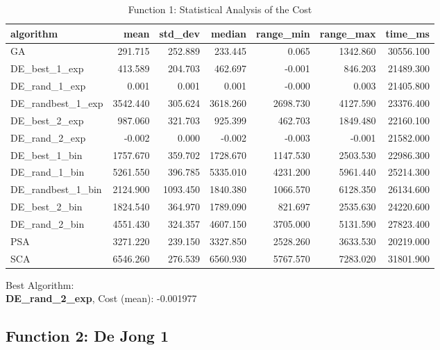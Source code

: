 \documentclass[12pt]{article}
\begin{document}
\begin{table}[H]
    \centering
    \footnotesize
\begin{tabular}{lrrrrrr}
\toprule
         algorithm &     mean &  std\_dev &   median &  range\_min &  range\_max &   time\_ms \\
\midrule
                GA &  291.715 &  252.889 &  233.445 &      0.065 &   1342.860 & 30556.100 \\
     DE\_best\_1\_exp &  413.589 &  204.703 &  462.697 &     -0.001 &    846.203 & 21489.300 \\
     DE\_rand\_1\_exp &    0.001 &    0.001 &    0.001 &     -0.000 &      0.003 & 21405.800 \\
 DE\_randbest\_1\_exp & 3542.440 &  305.624 & 3618.260 &   2698.730 &   4127.590 & 23376.400 \\
     DE\_best\_2\_exp &  987.060 &  321.703 &  925.399 &    462.703 &   1849.480 & 22160.100 \\
     DE\_rand\_2\_exp &   -0.002 &    0.000 &   -0.002 &     -0.003 &     -0.001 & 21582.000 \\
     DE\_best\_1\_bin & 1757.670 &  359.702 & 1728.670 &   1147.530 &   2503.530 & 22986.300 \\
     DE\_rand\_1\_bin & 5261.550 &  396.785 & 5335.010 &   4231.200 &   5961.440 & 25214.300 \\
 DE\_randbest\_1\_bin & 2124.900 & 1093.450 & 1840.380 &   1066.570 &   6128.350 & 26134.600 \\
     DE\_best\_2\_bin & 1824.540 &  364.970 & 1789.090 &    821.697 &   2535.630 & 24220.600 \\
     DE\_rand\_2\_bin & 4551.430 &  324.357 & 4607.150 &   3705.000 &   5131.590 & 27823.400 \\
               PSA & 3271.220 &  239.150 & 3327.850 &   2528.260 &   3633.530 & 20219.000 \\
               SCA & 6546.260 &  276.539 & 6560.930 &   5767.570 &   7283.020 & 31801.900 \\
\bottomrule
\end{tabular}

\caption{Function 1: Statistical Analysis of the Cost} 
    \end{table}
Best Algorithm: \\
\textbf{DE\_rand\_2\_exp}, Cost (mean): -0.001977\\
\newpage
\subsection{Function 2: De Jong 1}
\end{document}
